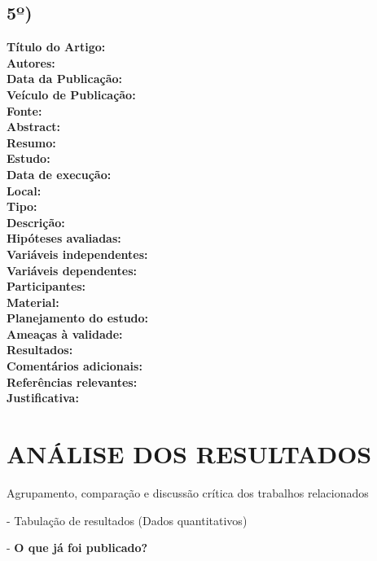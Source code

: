 \documentclass[12pt,a4paper]{article}
\begin{document}
\subsection*{5º)}
\noindent \textbf{Título do Artigo:} \hrulefill \\
\textbf{Autores:} \hrulefill \\
\textbf{Data da Publicação:} \hrulefill \\
\textbf{Veículo de Publicação:} \hrulefill \\
\textbf{Fonte:} \hrulefill \\
\textbf{Abstract:} \hrulefill \\
\textbf{Resumo:} \hrulefill \\
\textbf{Estudo:} \hrulefill \\
\textbf{Data de execução:} \hrulefill \\
\textbf{Local:} \hrulefill \\
\textbf{Tipo:} \hrulefill \\
\textbf{Descrição:} \hrulefill \\
\textbf{Hipóteses avaliadas:} \hrulefill \\
\textbf{Variáveis independentes:} \hrulefill \\
\textbf{Variáveis dependentes:} \hrulefill \\
\textbf{Participantes:} \hrulefill \\
\textbf{Material:} \hrulefill \\
\textbf{Planejamento do estudo:} \hrulefill \\
\textbf{Ameaças à validade:} \hrulefill \\
\textbf{Resultados:} \hrulefill \\
\textbf{Comentários adicionais:} \hrulefill \\
\textbf{Referências relevantes:} \hrulefill \\
\textbf{Justificativa:} \hrulefill

\newpage
\section*{ANÁLISE DOS RESULTADOS}

\noindent Agrupamento, comparação e discussão crítica dos trabalhos relacionados

\vspace{0.3cm}
\noindent - Tabulação de resultados (Dados quantitativos)

\vspace{0.3cm}
\noindent \hspace{1cm} - \textbf{O que já foi publicado?} \hrulefill
\end{document}
